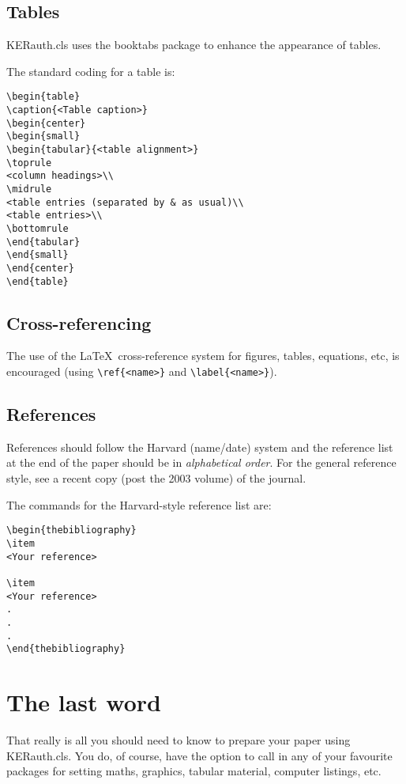 \documentclass{KERauth}
\begin{document}
\subsection{Tables}
\textsf{KERauth.cls} uses the \textsf{booktabs} package to
enhance the appearance of tables.

The standard coding for a table is:
\begin{verbatim}
\begin{table}
\caption{<Table caption>}
\begin{center}
\begin{small}
\begin{tabular}{<table alignment>}
\toprule
<column headings>\\
\midrule
<table entries (separated by & as usual)\\
<table entries>\\
\bottomrule
\end{tabular}
\end{small}
\end{center}
\end{table}
\end{verbatim}

\subsection{Cross-referencing}
The use of the \LaTeX\ cross-reference system
for figures, tables, equations, etc, is encouraged
(using \verb"\ref{<name>}" and \verb"\label{<name>}").

\subsection{References}
References should follow the Harvard (name/date) system and the
reference list at the end of the paper should be in
\emph{alphabetical order}.
For the general reference style, see a recent copy (post the 2003
volume) of the journal.

The commands for the Harvard-style reference list are:
\begin{verbatim}
\begin{thebibliography}
\item
<Your reference>

\item
<Your reference>
.
.
.
\end{thebibliography}
\end{verbatim}

\section{The last word}
That really is all you should need to know to prepare your paper
using \textsf{KERauth.cls}.
You do, of course, have the option to call in any of your
favourite packages for setting maths, graphics, tabular material,
computer listings, etc.
\end{document}
